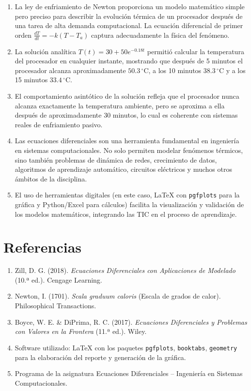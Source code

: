 \documentclass[12pt,a4paper]{article}
\begin{document}
\begin{enumerate}
  \item La ley de enfriamiento de Newton proporciona un modelo matemático simple pero preciso para describir la evolución térmica de un procesador después de una tarea de alta demanda computacional. La ecuación diferencial de primer orden \(\frac{dT}{dt} = -k(T - T_a)\) captura adecuadamente la física del fenómeno.

  \item La solución analítica \(T(t) = 30 + 50e^{-0.18t}\) permitió calcular la temperatura del procesador en cualquier instante, mostrando que después de 5 minutos el procesador alcanza aproximadamente \(50.3\,^{\circ}\mathrm{C}\), a los 10 minutos \(38.3\,^{\circ}\mathrm{C}\) y a los 15 minutos \(33.4\,^{\circ}\mathrm{C}\).

  \item El comportamiento asintótico de la solución refleja que el procesador nunca alcanza exactamente la temperatura ambiente, pero se aproxima a ella después de aproximadamente 30 minutos, lo cual es coherente con sistemas reales de enfriamiento pasivo.

  \item Las ecuaciones diferenciales son una herramienta fundamental en ingeniería en sistemas computacionales. No solo permiten modelar fenómenos térmicos, sino también problemas de dinámica de redes, crecimiento de datos, algoritmos de aprendizaje automático, circuitos eléctricos y muchos otros ámbitos de la disciplina.

  \item El uso de herramientas digitales (en este caso, \LaTeX{} con \texttt{pgfplots} para la gráfica y Python/Excel para cálculos) facilita la visualización y validación de los modelos matemáticos, integrando las TIC en el proceso de aprendizaje.
\end{enumerate}

\section{Referencias}

\begin{enumerate}
  \item Zill, D. G. (2018). \textit{Ecuaciones Diferenciales con Aplicaciones de Modelado} (10.ª ed.). Cengage Learning.
  \item Newton, I. (1701). \textit{Scala graduum caloris} (Escala de grados de calor). Philosophical Transactions.
  \item Boyce, W. E. \& DiPrima, R. C. (2017). \textit{Ecuaciones Diferenciales y Problemas con Valores en la Frontera} (11.ª ed.). Wiley.
  \item Software utilizado: \LaTeX{} con los paquetes \texttt{pgfplots}, \texttt{booktabs}, \texttt{geometry} para la elaboración del reporte y generación de la gráfica.
  \item Programa de la asignatura Ecuaciones Diferenciales -- Ingeniería en Sistemas Computacionales.
\end{enumerate}
\end{document}
